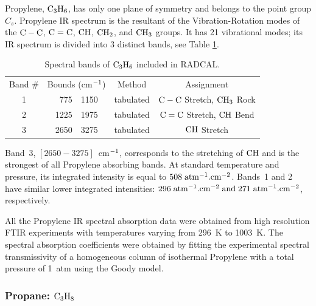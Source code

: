   Propylene, $\rm C_3H_6$, has only one plane of symmetry 
  and belongs to the point group $C_s$. Propylene IR spectrum
  is the resultant of the Vibration-Rotation modes of
  the $\rm C-C$, $\rm C=C$, $\rm CH$, $\rm CH_2$, and $\rm CH_3$ groups.
  It has 21 vibrational modes; its IR spectrum is divided into 3 distinct bands,
  see Table \ref{Table::C3H6}.
  \begin{table}[h p] 
   \centering
   \caption{Spectral bands of $\rm C_3H_6$ included in RADCAL.}
   \vspace{0.1in}
   \label{Table::C3H6}
   \begin{tabular}{|c|r@{-}l|c|c|} 
    \hline
    Band \# & \multicolumn{2}{|l|}{Bounds (cm$\rm ^{-1}$) } & Method & Assignment \\
    \cline{1-5}  
    1 & 775  & 1150 & tabulated &  $\rm C-C$ Stretch, $\rm CH_3$ Rock\\
    2 & 1225 & 1975 & tabulated &  $\rm C=C$ Stretch, $\rm CH$ Bend\\
    3 & 2650 & 3275 & tabulated &  $\rm CH$ Stretch\\
    \hline
   \end{tabular} 
  \end{table}
  Band~3, $\left[2650-3275\right]$~cm$\rm ^{-1}$, corresponds to the 
  stretching of $\rm CH$ and is the strongest of all Propylene absorbing bands.
  At standard temperature and pressure, its integrated intensity 
  is equal to $508\;\rm {atm^{-1}.cm^{-2}}$. Bands~1 and 2 have similar
  lower integrated intensities: $296\;\rm {atm^{-1}.cm^{-2}}\;and\;
  271\;\rm {atm^{-1}.cm^{-2}}$, respectively.
  
  All the Propylene IR spectral absorption data were obtained from high resolution
  FTIR experiments with temperatures varying from 296~K to 1003~K.
  The spectral absorption coefficients were obtained by fitting the experimental
  spectral transmissivity of a homogeneous column of isothermal Propylene
  with a total pressure of 1~atm using the Goody model. 

\subsubsection{Propane: $\rm C_3H_8$}


